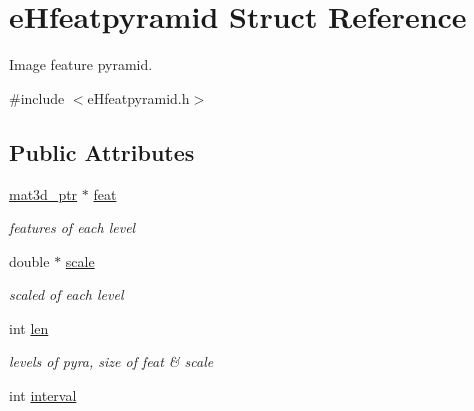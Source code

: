 \hypertarget{structeHfeatpyramid}{\section{e\-Hfeatpyramid Struct Reference}
\label{structeHfeatpyramid}
}


Image feature pyramid.  




{\ttfamily \#include $<$e\-Hfeatpyramid.\-h$>$}

\subsection*{Public Attributes}
\begin{DoxyCompactItemize}
\item 
\hypertarget{structeHfeatpyramid_ad989df221610a00d060531ed4371a83c}{\hyperlink{eHmatrix_8h_aa07790a7fe1ed877b1482166e499794b}{mat3d\-\_\-ptr} $\ast$ \hyperlink{structeHfeatpyramid_ad989df221610a00d060531ed4371a83c}{feat}}\label{structeHfeatpyramid_ad989df221610a00d060531ed4371a83c}

\begin{DoxyCompactList}\small\item\em features of each level \end{DoxyCompactList}\item 
\hypertarget{structeHfeatpyramid_a6aae2002e28a0c9d77afe51ad7d4cb97}{double $\ast$ \hyperlink{structeHfeatpyramid_a6aae2002e28a0c9d77afe51ad7d4cb97}{scale}}\label{structeHfeatpyramid_a6aae2002e28a0c9d77afe51ad7d4cb97}

\begin{DoxyCompactList}\small\item\em scaled of each level \end{DoxyCompactList}\item 
\hypertarget{structeHfeatpyramid_a7e5298a7d41a2ee7567b28eb0a402ca2}{int \hyperlink{structeHfeatpyramid_a7e5298a7d41a2ee7567b28eb0a402ca2}{len}}\label{structeHfeatpyramid_a7e5298a7d41a2ee7567b28eb0a402ca2}

\begin{DoxyCompactList}\small\item\em levels of pyra, size of feat \& scale \end{DoxyCompactList}\item 
\hypertarget{structeHfeatpyramid_ad7fff47e725b98d4f3f86b28069056f7}{int \hyperlink{structeHfeatpyramid_ad7fff47e725b98d4f3f86b28069056f7}{interval}}\label{structeHfeatpyramid_ad7fff47e725b98d4f3f86b28069056f7}


\end{DoxyCompactItemize}
